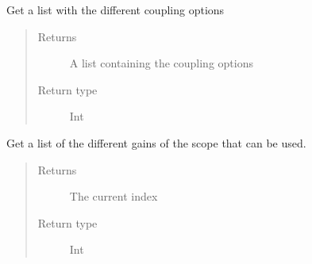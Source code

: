 \documentclass[letterpaper,10pt,english]{sphinxmanual}
\begin{document}
\begin{fulllineitems}
\begin{fulllineitems}
\end{fulllineitems}


\begin{fulllineitems}
\label{\detokenize{index:TiePieLCR_settings.TiePieLCR_settings.get_scope_coupling_name_list}}
\sphinxAtStartPar
Get a list with the different coupling options
\begin{quote}\begin{description}
\item[{Returns}] \leavevmode
\sphinxAtStartPar
A list containing the coupling options

\item[{Return type}] \leavevmode
\sphinxAtStartPar
Int

\end{description}\end{quote}

\end{fulllineitems}


\begin{fulllineitems}
\label{\detokenize{index:TiePieLCR_settings.TiePieLCR_settings.get_scope_range_list}}
\sphinxAtStartPar
Get a list of the different gains of the scope that can be used.
\begin{quote}\begin{description}
\item[{Returns}] \leavevmode
\sphinxAtStartPar
The current index

\item[{Return type}] \leavevmode
\sphinxAtStartPar
Int

\end{description}\end{quote}

\end{fulllineitems}



\end{fulllineitems}
\end{document}
